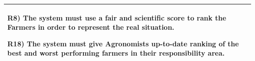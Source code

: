 \documentclass[table, 12pt]{article}
\begin{document}
\begin{itemize}
\begin{longtable}{|p{}|p{}|}
                                                                                       R8) The system must use a fair and scientific score to rank the Farmers in order to represent the real situation.
                                                                                       
                                                                                       R18) The system must give Agronomists up-to-date ranking of the best and worst performing farmers in their responsibility area.\\\hline
                    
        \end{longtable}
    
    \end{itemize}

        \newpage
\end{document}
